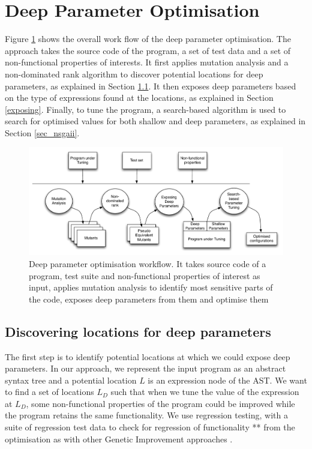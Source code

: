 \section{Deep Parameter Optimisation}
\label{sec_deep_parameter_optimisation}

Figure \ref{system} shows the overall work flow of the deep parameter optimisation. The approach takes the source code of the program, a set of test data and a set of non-functional properties of interests. 
It first applies mutation analysis and a non-dominated rank algorithm to discover potential locations for deep parameters, as explained in Section \ref{discovering}. It then exposes deep parameters based on the type of expressions found at the locations, as explained in Section \ref{exposing}. Finally, to tune the program, a search-based algorithm is used to search for optimised values for both shallow and deep parameters, as explained in Section \ref{sec_nsgaii}.

\begin{figure}[htbp]
\centering
\includegraphics[width=6.2in]{pics/new_system}
\caption{Deep parameter optimisation workflow. It takes source code of a program, test suite and non-functional properties of interest as input, applies mutation analysis to identify most sensitive parts of the code, exposes deep parameters from them and optimise them}\label{system}
\end{figure}

\subsection{Discovering locations for deep parameters}
\label{discovering}
The first step is to identify potential locations at which we could expose deep parameters. 
In our approach, we represent the input program as an abstract syntax tree and a potential location $L$ is an expression node of the AST. 
We want to find a set of locations $L_D$ such that when we tune the value of the expression at $L_D$, some non-functional properties of the program could be improved while the program retains the same functionality. 
We use regression testing, with a suite of regression test data to check for regression of functionality ** from the optimisation as with other Genetic Improvement approaches \cite{justyna2013, Langdon:2014:IMI:2576768.2598244}.


